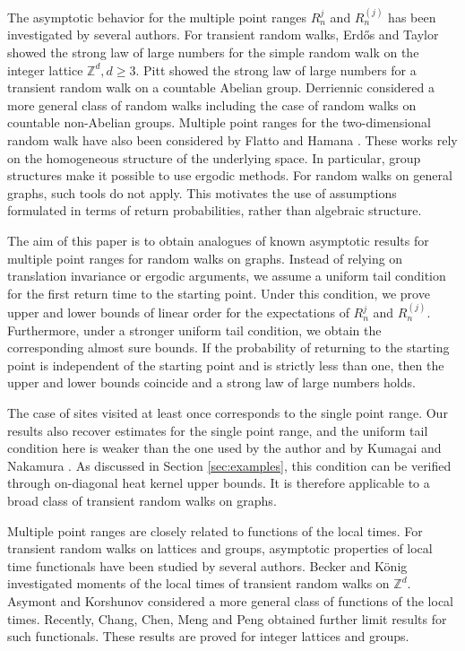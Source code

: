 \documentclass[a4paper, reqno, 11pt]{amsart}
\theoremstyle{definition}
\begin{document}
The asymptotic behavior for the multiple point ranges $R_n^{j}$ and $R_n^{(j)}$  has been investigated by several authors. 
For transient random walks, Erd\H{o}s and Taylor \cite{ET1960} showed the strong law of large numbers for the simple random walk on the integer lattice $\mathbb{Z}^d, d \ge 3$. 
Pitt \cite{Pitt1974}  showed the strong law of large numbers for a transient random walk on a countable Abelian group. 
Derriennic \cite{Derriennic1980} considered a more general class of random walks including the case of random walks on countable non-Abelian groups.
Multiple point ranges for the two-dimensional random walk have also been considered by  Flatto \cite{Flatto1976} and Hamana \cite{hamana1997,Hamana1998}. 
These works rely on the homogeneous structure of the underlying space. 
In particular, group structures make it possible to use ergodic methods. 
For random walks on general graphs, such tools do not apply. 
This motivates the use of assumptions formulated in terms of return probabilities, rather than algebraic structure. 

The aim of this paper is to obtain analogues of known asymptotic results for multiple point ranges for random walks on graphs.  
Instead of relying on translation invariance or ergodic arguments, we assume a uniform tail condition for the first return time to the starting point. 
Under this condition, we prove upper and lower bounds of linear order for the expectations of $R_n^j$ and $R_n^{(j)}$.
Furthermore, under a stronger uniform tail condition, we obtain the corresponding almost sure bounds. 
If the probability of returning to the starting point is independent of the starting point and is strictly less than one, 
then the upper and lower bounds coincide and a strong law of large numbers holds. 

The case of sites visited at least once corresponds to the single point range. 
Our results also recover estimates for the single point range, and the uniform tail condition here is weaker than the one used by the author  \cite[Corollary 2.3]{Okamura2014} and by Kumagai and Nakamura \cite[Proposition 5.7]{KN2018}. 
As discussed in Section \ref{sec:examples}, this condition can be verified through on-diagonal heat kernel upper bounds. 
It is therefore applicable to a broad class of transient random walks on graphs.

Multiple point ranges are closely related to functions of the local times. 
For transient random walks on lattices and groups, asymptotic properties of local time functionals have been studied by several authors. 
Becker and K\"{o}nig \cite{BK2009} investigated moments of the local times of transient random walks on $\mathbb Z^d$. 
Asymont and Korshunov \cite{AK2020} considered a more general class of functions of the local times.
Recently, Chang, Chen, Meng and Peng \cite{CCMP2026}  obtained further limit results for such functionals.
These results are proved for integer lattices and groups. 
\end{document}
